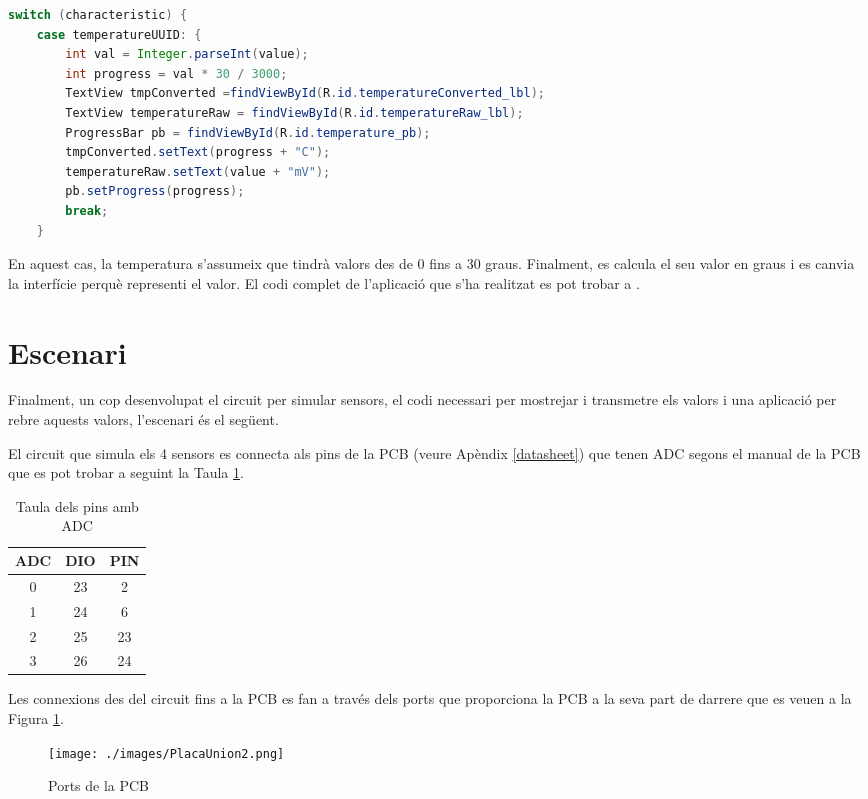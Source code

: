 \begin{lstlisting}[language=java]
 switch (characteristic) {
	case temperatureUUID: {
		int val = Integer.parseInt(value);
		int progress = val * 30 / 3000;
		TextView tmpConverted =findViewById(R.id.temperatureConverted_lbl);
		TextView temperatureRaw = findViewById(R.id.temperatureRaw_lbl);
		ProgressBar pb = findViewById(R.id.temperature_pb);
		tmpConverted.setText(progress + "C");
		temperatureRaw.setText(value + "mV");
		pb.setProgress(progress);
		break;
	}
\end{lstlisting}

En aquest cas, la temperatura s'assumeix que tindrà valors des de 0 fins a 30 graus.
Finalment, es calcula el seu valor en graus i es canvia la interfície perquè representi el valor.
El codi complet de l'aplicació que s'ha realitzat es pot trobar a \cite{android_repo}.

\newpage
\section{Escenari}
Finalment, un cop desenvolupat el circuit per simular sensors, el codi necessari per mostrejar i transmetre els valors i una aplicació per rebre aquests valors, l'escenari és el següent.

El circuit que simula els 4 sensors es connecta als pins de la PCB (veure Apèndix \ref{datasheet}) que tenen ADC segons el manual de la PCB que es pot trobar a \cite{manual_placa} seguint la Taula \ref{connexions}.

\begin{table}[!h]
	\begin{center}
		\begin{tabular}{|c|c|c|}
			\hline
			ADC			&	DIO		& 	PIN		\\	\hline
			0			&	23		&	2		\\	\hline
			1			&	24		&	6		\\	\hline
			2			&	25		&	23		\\	\hline
			3			&	26		&	24		\\	\hline
		\end{tabular}
	\end{center}
	\caption{Taula dels pins amb ADC}
	\label{connexions}
\end{table}

Les connexions des del circuit fins a la PCB es fan a través dels ports que proporciona la PCB a la seva part de darrere que es veuen a la Figura \ref{ports_placa}.

\begin{figure}[h]
	\begin{center}
		\texttt{[image: ./images/PlacaUnion2.png]}
		\caption{Ports de la PCB}
		\label{ports_placa}
	\end{center}
\end{figure}


